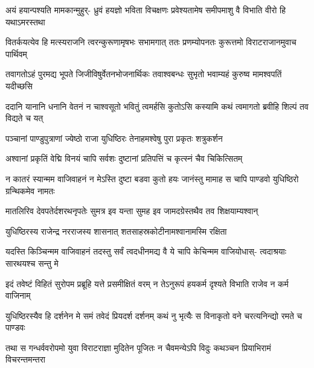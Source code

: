 \fourlineindentedshloka
{अयं हयान्पश्यति मामकान्मुहुर्-}
{ध्रुवं हयज्ञो भविता विचक्षणः}
{प्रवेश्यतामेष समीपमाशु वै}
{विभाति वीरो हि यथाऽमरस्तथा}


\fourlineindentedshloka
{वितर्कयत्येव हि मत्स्यराजनि}
{त्वरन्कुरूणामृषभः सभामगात्}
{ततः प्रणम्योपनतः कुरूत्तमो}
{विराटराजानमुवाच पार्थिवम्}


\fourlineindentedshloka
{तवागतोऽहं पुरमद्य भूपते}
{जिजीविषुर्वेतनभोजनार्थिकः}
{तवाश्वबन्धः सुभृतो भवाम्यहं}
{कुरुष्व मामश्वपतिं यदीच्छसि}




\fourlineindentedshloka
{ददानि यानानि धनानि वेतनं}
{न चाश्वसूतो भवितुं त्वमर्हसि}
{कुतोऽसि कस्यामि कथं त्वमागतो}
{ब्रवीहि शिल्पं तव विद्यते च यत्}




\twolineshloka
{पञ्चानां पाण्डुपुत्राणां ज्येष्ठो राजा युधिष्ठिरः}
{तेनाहमश्वेषु पुरा प्रकृतः शत्रुकर्शन}


\twolineshloka
{अश्वानां प्रकृतिं वेद्मि विनयं चापि सर्वशः}
{दुष्टानां प्रतिपत्तिं च कृत्स्नं चैव चिकित्सितम्}


\fourlineindentedshloka
{न कातरं स्यान्मम वाजिवाहनं}
{न मेऽस्ति दुष्टा बडवा कुतो हयः}
{जानंस्तु मामाह स चापि पाण्डवो}
{युधिष्ठिरो ग्रन्थिकमेव नामतः}


\twolineshloka
{मातलिरिव देवपतेर्दशरथनृपतेः सुमत्र इव यन्ता}
{सुमह इव जामदग्रेस्तथैव तव शिक्षयाम्यश्वान्}


\twolineshloka
{युधिष्ठिरस्य राजेन्द्र नरराजस्य शासनात्}
{शतसाहस्रकोटीनामश्वानामस्मि रक्षिता}




\fourlineindentedshloka
{यदस्ति किञ्चिन्मम वाजिवाहनं}
{तदस्तु सर्वं त्वदधीनमद्य वै}
{ये चापि केचिन्मम वाजियोधास्-}
{त्वदाश्रयाः सारथयश्च सन्तु मे}


\fourlineindentedshloka
{इदं तवेष्टं विहितं सुरोपम}
{प्रब्रूहि यत्ते प्रसमीक्षितं वरम्}
{न तेऽनुरूपं हयकर्म दृश्यते}
{विभाति राजेव न कर्म वाजिनाम्}


\fourlineindentedshloka
{युधिष्ठिरस्यैव हि दर्शनेन मे}
{समं तवेदं प्रियदर्श दर्शनम्}
{कथं नु भृत्यैः स विनाकृतो वने}
{चरत्यनिन्द्यो रमते च पाण्डवः}



\fourlineindentedshloka
{तथा स गन्धर्ववरोपमो युवा}
{विराटराज्ञा मुदितेन पूजितः}
{न चैवमन्येऽपि विदुः कथञ्चन}
{प्रियाभिरामं विचरन्तमन्तरा}

